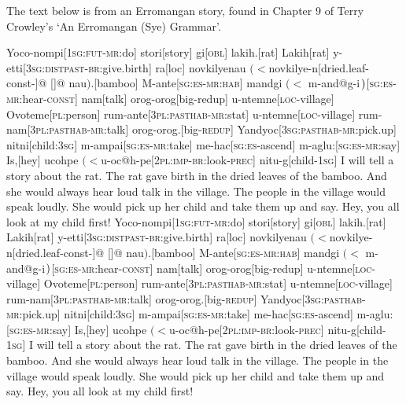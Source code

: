 
\def\schwa{{\ips @}}
The text below is from an Erromangan story, found in Chapter 9 of Terry
Crowley's `An Erromangan (Sye) Grammar'.

\ex[glstyle=nlevel,glspace=1em plus .6em minus .2em,
   glneveryline={\it},extraglskip=1.2ex,glhangindent=0pt]
\begingl
Yoco-nompi[\textsc{1sg:fut-mr:}do]
stori[story]
gi[\textsc{obl}]
lakih.[rat]
Lakih[rat]
y-etti[\textsc{3sg:distpast-br:}give.birth]
ra[\sc loc]
{novkilyenau $(<$novkilye-n}[dried.leaf-\sc const-]@
{ }[]@
nau$)$.[bamboo]
M-ante[\textsc{sg:es-mr:hab}]
{mandgi $(<$ m-and\schwa g-i$\mskip2mu)$}[\textsc{sg:es-mr:}hear-\textsc{const}]
nam[talk]
orog-orog[big-\sc redup]
u-ntemne[\textsc{loc}-village]
Ovoteme[\textsc{pl}:person]
rum-ante[\textsc{3pl:pasthab-mr:}stat]
u-ntemne[\textsc{loc}-village]
rum-nam[\textsc{3pl:pasthab-mr:}talk]
orog-orog.[big-\textsc{redup}]
Yandyoc[\textsc{3sg:pasthab-mr:}pick.up]
nitni[child:\textsc{3sg}]
m-ampai[\textsc{sg:es-mr:}take]
me-hac[\textsc{sg:es-}ascend]
m-aglu:[\textsc{sg:es-mr:}say]
Is,[hey]
{ucohpe $(<$u-oc\schwa h-pe}[\textsc{2pl:imp-br:}look\textsc{-prec}]
nitu-g[child\textsc{-1sg}]
\glft I will tell a story about the rat.
The rat gave birth in the dried leaves of the bamboo.
And she would always hear loud talk in the village.
The people in the village would speak loudly.
She would pick up her child and take them up and say.
Hey, you all look at my child first!
\endgl
\bigskip
\begingl
Yoco-nompi[\textsc{1sg:fut-mr:}do]
stori[story]
gi[\textsc{obl}]
lakih.[rat]
Lakih[rat]
y-etti[\textsc{3sg:distpast-br:}give.birth]
ra[\sc loc]
{novkilyenau $(<$novkilye-n}[dried.leaf-\sc const-]@
{ }[]@
nau$)$.[bamboo]
M-ante[\textsc{sg:es-mr:hab}]
{mandgi $(<$ m-and\schwa g-i$\mskip2mu)$}[\textsc{sg:es-mr:}hear-\textsc{const}]
nam[talk]
orog-orog[big-\sc redup]
u-ntemne[\textsc{loc}-village]
Ovoteme[\textsc{pl}:person]
rum-ante[\textsc{3pl:pasthab-mr:}stat]
u-ntemne[\textsc{loc}-village]
rum-nam[\textsc{3pl:pasthab-mr:}talk]
orog-orog.[big-\textsc{redup}]
Yandyoc[\textsc{3sg:pasthab-mr:}pick.up]
nitni[child:\textsc{3sg}]
m-ampai[\textsc{sg:es-mr:}take]
me-hac[\textsc{sg:es-}ascend]
m-aglu:[\textsc{sg:es-mr:}say]
Is,[hey]
{ucohpe $(<$u-oc\schwa h-pe}[\textsc{2pl:imp-br:}look\textsc{-prec}]
nitu-g[child\textsc{-1sg}]
\glft I will tell a story about the rat.
The rat gave birth in the dried leaves of the bamboo.
And she would always hear loud talk in the village.
The people in the village would speak loudly.
She would pick up her child and take them up and say.
Hey, you all look at my child first!
\endgl
\xe


